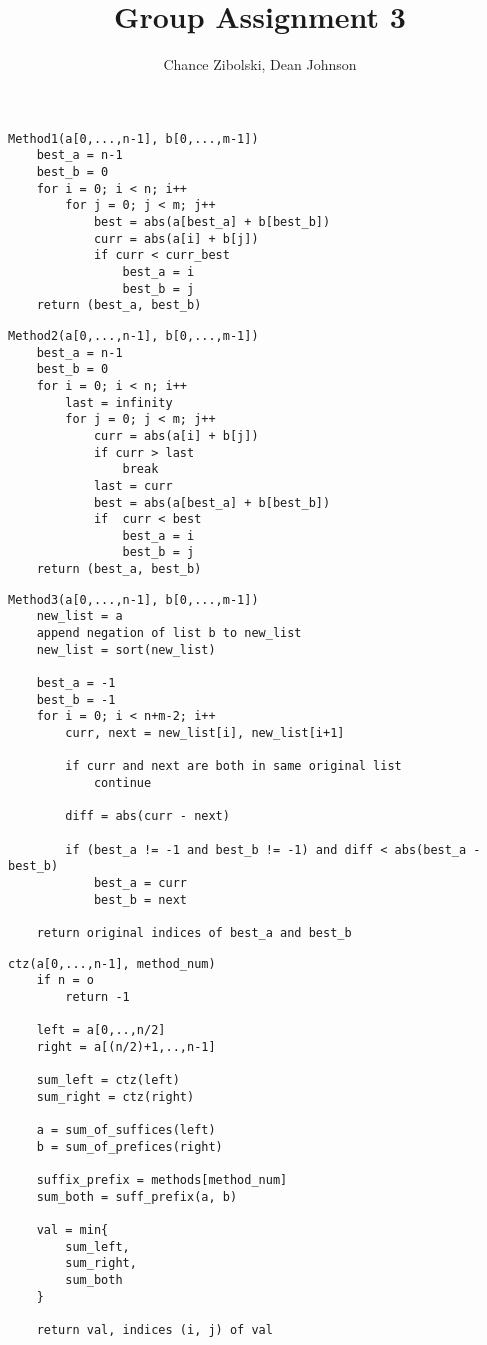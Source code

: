 \documentclass{article}
\title{Group Assignment 3}
\author{Chance Zibolski, Dean Johnson}
\begin{document}
\maketitle

\begin{verbatim}
Method1(a[0,...,n-1], b[0,...,m-1])
    best_a = n-1
    best_b = 0
    for i = 0; i < n; i++
        for j = 0; j < m; j++
            best = abs(a[best_a] + b[best_b])
            curr = abs(a[i] + b[j])
            if curr < curr_best
                best_a = i
                best_b = j
    return (best_a, best_b)
\end{verbatim}

\begin{verbatim}
Method2(a[0,...,n-1], b[0,...,m-1])
    best_a = n-1
    best_b = 0
    for i = 0; i < n; i++
        last = infinity
        for j = 0; j < m; j++
            curr = abs(a[i] + b[j])
            if curr > last
                break
            last = curr
            best = abs(a[best_a] + b[best_b])
            if  curr < best
                best_a = i
                best_b = j
    return (best_a, best_b)
\end{verbatim}

\begin{verbatim}
Method3(a[0,...,n-1], b[0,...,m-1])
    new_list = a
    append negation of list b to new_list
    new_list = sort(new_list)

    best_a = -1
    best_b = -1
    for i = 0; i < n+m-2; i++
        curr, next = new_list[i], new_list[i+1]

        if curr and next are both in same original list
            continue

        diff = abs(curr - next)

        if (best_a != -1 and best_b != -1) and diff < abs(best_a - best_b)
            best_a = curr
            best_b = next

    return original indices of best_a and best_b
\end{verbatim}


\begin{verbatim}
ctz(a[0,...,n-1], method_num)
    if n = o
        return -1

    left = a[0,..,n/2]
    right = a[(n/2)+1,..,n-1]

    sum_left = ctz(left)
    sum_right = ctz(right)

    a = sum_of_suffices(left)
    b = sum_of_prefices(right)

    suffix_prefix = methods[method_num]
    sum_both = suff_prefix(a, b)

    val = min{
        sum_left,
        sum_right,
        sum_both
    }

    return val, indices (i, j) of val

\end{verbatim}
\end{document}

